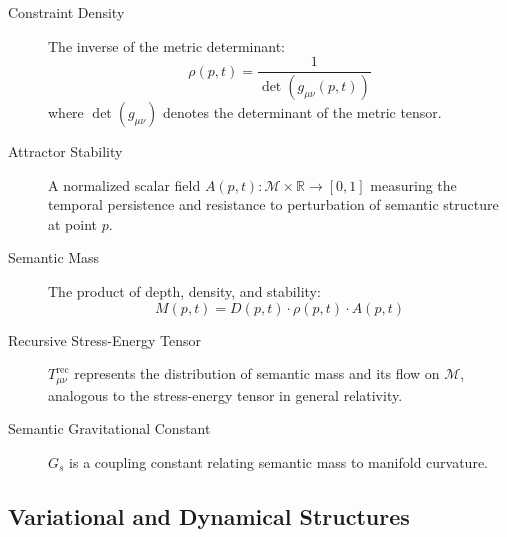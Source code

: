 \begin{description}

\item[Constraint Density] The inverse of the metric determinant:
\begin{equation}
\rho(p,t) = \frac{1}{\det(g_{\mu\nu}(p,t))}
\end{equation}
where \(\det(g_{\mu\nu})\) denotes the determinant of the metric tensor.

\item[Attractor Stability] A normalized scalar field \(A(p,t) : \mathcal{M} \times \mathbb{R} \rightarrow [0,1]\) measuring the temporal persistence and resistance to perturbation of semantic structure at point \(p\).

\item[Semantic Mass] The product of depth, density, and stability:
\begin{equation}
M(p,t) = D(p,t) \cdot \rho(p,t) \cdot A(p,t)
\end{equation}

\item[Recursive Stress-Energy Tensor] \(T^{\text{rec}}_{\mu\nu}\) represents the distribution of semantic mass and its flow on \(\mathcal{M}\), analogous to the stress-energy tensor in general relativity.

\item[Semantic Gravitational Constant] \(G_s\) is a coupling constant relating semantic mass to manifold curvature.

\end{description}


\subsection{Variational and Dynamical Structures}
\label{1.1.5:variational_and_dynamical_structures}

